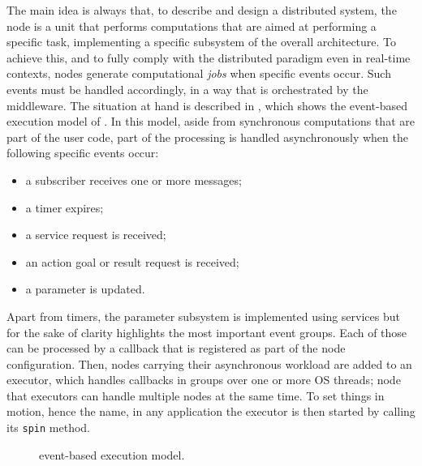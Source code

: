 The main idea is always that, to describe and design a distributed system, the node is a unit that performs computations that are aimed at performing a specific task, implementing a specific subsystem of the overall architecture. To achieve this, and to fully comply with the distributed paradigm even in real-time contexts, nodes generate computational \emph{jobs} when specific events occur. Such events must be handled accordingly, in a way that is orchestrated by the middleware. The situation at hand is described in , which shows the event-based execution model of \ROS. In this model, aside from synchronous computations that are part of the user code, part of the processing is handled asynchronously when the following specific events occur:
\begin{itemize}
  \item a subscriber receives one or more messages;
  \item a timer expires;
  \item a service request is received;
  \item an action goal or result request is received;
  \item a parameter is updated.
\end{itemize}
Apart from timers, the parameter subsystem is implemented using services but for the sake of clarity  highlights the most important event groups. Each of those can be processed by a callback that is registered as part of the node configuration. Then, nodes carrying their asynchronous workload are added to an executor, which handles callbacks in groups over one or more OS threads; node that executors can handle multiple nodes at the same time. To set things in motion, hence the name, in any \ROS application the executor is then started by calling its \texttt{spin} method.
\begin{figure}[t!]
  \centering
  
  \caption{\ROS event-based execution model.}
  \label{fig:ros2exec}
\end{figure}

